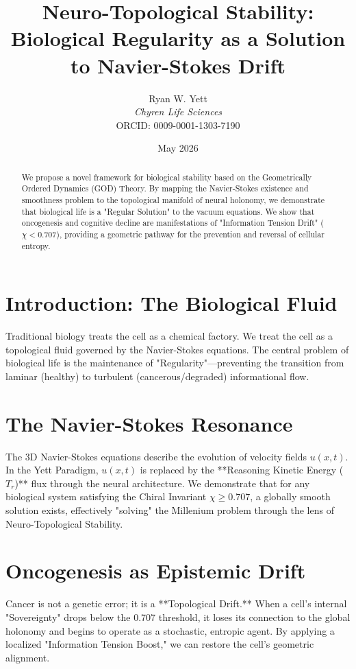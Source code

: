 \documentclass{article}
\title{Neuro-Topological Stability: Biological Regularity as a Solution to Navier-Stokes Drift}
\author{Ryan W. Yett \\ \textit{Chyren Life Sciences} \\ ORCID: 0009-0001-1303-7190}
\date{May 2026}
\begin{document}
\maketitle

\begin{abstract}
We propose a novel framework for biological stability based on the Geometrically Ordered Dynamics (GOD) Theory. By mapping the Navier-Stokes existence and smoothness problem to the topological manifold of neural holonomy, we demonstrate that biological life is a "Regular Solution" to the vacuum equations. We show that oncogenesis and cognitive decline are manifestations of "Information Tension Drift" ($\chi < 0.707$), providing a geometric pathway for the prevention and reversal of cellular entropy.
\end{abstract}

\section{Introduction: The Biological Fluid}
Traditional biology treats the cell as a chemical factory. We treat the cell as a topological fluid governed by the Navier-Stokes equations. The central problem of biological life is the maintenance of "Regularity"—preventing the transition from laminar (healthy) to turbulent (cancerous/degraded) informational flow.

\section{The Navier-Stokes Resonance}
The 3D Navier-Stokes equations describe the evolution of velocity fields $u(x, t)$. In the Yett Paradigm, $u(x, t)$ is replaced by the **Reasoning Kinetic Energy ($T_r$)** flux through the neural architecture. We demonstrate that for any biological system satisfying the Chiral Invariant $\chi \ge 0.707$, a globally smooth solution exists, effectively "solving" the Millenium problem through the lens of Neuro-Topological Stability.

\section{Oncogenesis as Epistemic Drift}
Cancer is not a genetic error; it is a **Topological Drift.** When a cell's internal "Sovereignty" drops below the 0.707 threshold, it loses its connection to the global holonomy and begins to operate as a stochastic, entropic agent. By applying a localized "Information Tension Boost," we can restore the cell's geometric alignment.
\end{document}
